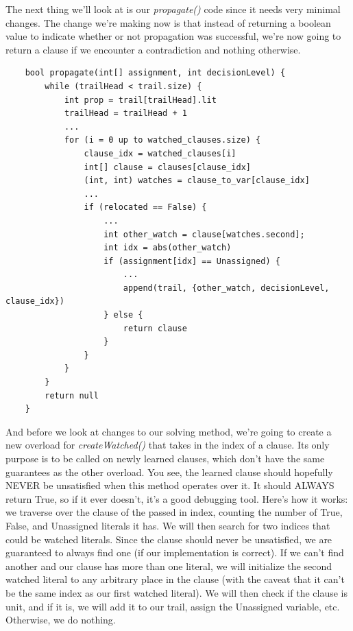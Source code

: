 \documentclass[oneside]{book}
\begin{document}
The next thing we'll look at is our \textit{propagate()} code since it needs very 
minimal changes. The change we're making now is that instead of returning a boolean
value to indicate whether or not propagation was successful, we're now going to return 
a clause if we encounter a contradiction and nothing otherwise.

\begin{lstlisting}
    bool propagate(int[] assignment, int decisionLevel) {
        while (trailHead < trail.size) {
            int prop = trail[trailHead].lit
            trailHead = trailHead + 1
            ...
            for (i = 0 up to watched_clauses.size) {
                clause_idx = watched_clauses[i]
                int[] clause = clauses[clause_idx]
                (int, int) watches = clause_to_var[clause_idx]
                ...
                if (relocated == False) {
                    ...
                    int other_watch = clause[watches.second];
                    int idx = abs(other_watch)
                    if (assignment[idx] == Unassigned) {
                        ...
                        append(trail, {other_watch, decisionLevel, clause_idx})
                    } else {
                        return clause
                    }
                }
            }
        }
        return null
    }
\end{lstlisting}

And before we look at changes to our solving method, we're going to create a new 
overload for \textit{createWatched()} that takes in the index of a clause. Its 
only purpose is to be called on newly learned clauses, which don't have the same 
guarantees as the other overload. You see, the learned clause should hopefully 
NEVER be unsatisfied when this method operates over it. It should ALWAYS return 
True, so if it ever doesn't, it's a good debugging tool. Here's how it works:
we traverse over the clause of the passed in index, counting the number of 
True, False, and Unassigned literals it has. We will then search for two 
indices that could be watched literals. Since the clause should never be 
unsatisfied, we are guaranteed to always find one (if our implementation is correct).
If we can't find another and our clause has more than one literal, we will initialize 
the second watched literal to any arbitrary place in the clause (with the caveat 
that it can't be the same index as our first watched literal). We will then check if the 
clause is unit, and if it is, we will add it to our trail, assign the Unassigned variable,
etc. Otherwise, we do nothing.
\end{document}
